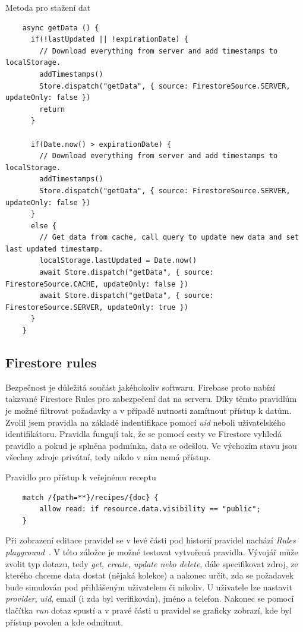 \begin{listing}[H]
    \caption{Metoda pro stažení dat}
    \begin{verbatim}
    async getData () {
      if(!lastUpdated || !expirationDate) {
        // Download everything from server and add timestamps to localStorage.
        addTimestamps()
        Store.dispatch("getData", { source: FirestoreSource.SERVER, updateOnly: false })
        return
      }

      if(Date.now() > expirationDate) {
        // Download everything from server and add timestamps to localStorage.
        addTimestamps()
        Store.dispatch("getData", { source: FirestoreSource.SERVER, updateOnly: false })
      }
      else {
        // Get data from cache, call query to update new data and set last updated timestamp.
        localStorage.lastUpdated = Date.now()
        await Store.dispatch("getData", { source: FirestoreSource.CACHE, updateOnly: false })
        await Store.dispatch("getData", { source: FirestoreSource.SERVER, updateOnly: true })
      }
    }
    \end{verbatim}
\end{listing}


\subsection{Firestore rules}
Bezpečnost je důležitá součást jakéhokoliv softwaru. Firebase proto nabízí takzvané Firestore Rules pro zabezpečení dat na serveru.
Díky těmto pravidlům je možné filtrovat požadavky a v případě nutnosti zamítnout přístup k datům. Zvolil jsem pravidla na základě
indentifikace pomocí \emph{uid} neboli uživatelského identifikátoru. Pravidla fungují tak, že se pomocí cesty ve Firestore vyhledá
pravidlo a pokud je splněna podmínka, data se odešlou. Ve výchozím stavu jsou všechny zdroje privátní, tedy nikdo v nim nemá přístup.

\begin{listing}[H]
    \caption{Pravidlo pro přístup k veřejnému receptu}
    \begin{verbatim}
    match /{path=**}/recipes/{doc} {
        allow read: if resource.data.visibility == "public";
    }
    \end{verbatim}
\end{listing}

Při zobrazení editace pravidel se v levé části pod historií pravidel nachází \emph{Rules playground}~\cite{FirebaseRulesPlayground}. V této záložce je možné
testovat vytvořená pravidla. Vývojář může zvolit typ dotazu, tedy \emph{get, create, update \emph{nebo} delete}, dále specifikovat
zdroj, ze kterého chceme data dostat (nějaká kolekce) a nakonec určit, zda se požadavek bude simulován pod přihlášeným uživatelem
či nikoliv. U uživatele lze nastavit \emph{provider}, \emph{uid}, email (i zda byl verifikován), jméno a telefon. Nakonec se pomocí tlačítka
\emph{run} dotaz spustí a v pravé části u pravidel se graficky zobrazí, kde byl přístup povolen a kde odmítnut.


